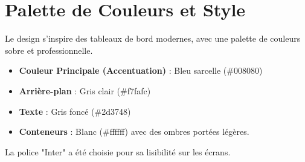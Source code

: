 \section{Palette de Couleurs et Style}
Le design s'inspire des tableaux de bord modernes, avec une palette de couleurs sobre et professionnelle.
\begin{itemize}
    \item \textbf{Couleur Principale (Accentuation)} : Bleu sarcelle (\#008080)
    \item \textbf{Arrière-plan} : Gris clair (\#f7fafc)
    \item \textbf{Texte} : Gris foncé (\#2d3748)
    \item \textbf{Conteneurs} : Blanc (\#ffffff) avec des ombres portées légères.
\end{itemize}
La police "Inter" a été choisie pour sa lisibilité sur les écrans.

